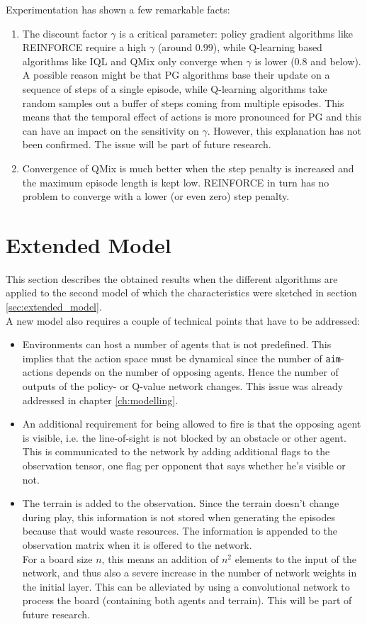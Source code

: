 Experimentation has shown a few remarkable facts:
\begin{enumerate}
    \item The discount factor $\gamma$ is a critical parameter: policy gradient algorithms like REINFORCE require a high $\gamma$ (around $0.99$), while Q-learning based algorithms like IQL and QMix only converge when $\gamma$ is lower ($0.8$ and below). A possible reason might be that PG algorithms base their update on a sequence of steps of a single episode, while Q-learning algorithms take random samples out a buffer of steps coming from multiple episodes. This means that the temporal effect of actions is more pronounced for PG and this can have an impact on the sensitivity on $\gamma$. However, this explanation has not been confirmed. The issue will be part of future research.
    \item Convergence of QMix is much better when the step penalty is increased and the maximum episode length is kept low. REINFORCE in turn has no problem to converge with a lower (or even zero) step penalty.
\end{enumerate}

\section{Extended Model}
\label{sec:init_model_applied}
This section describes the obtained results when the different algorithms are applied to the second model of which the characteristics were sketched in section \ref{sec:extended_model}.\\
A new model also requires a couple of technical points that have to be addressed:
\begin{itemize}
    \item Environments can host a number of agents that is not predefined. This implies that the action space must be dynamical since the number of {\tt aim}-actions depends on the number of opposing agents. Hence the number of outputs of the policy- or Q-value network changes. This issue was already addressed in chapter \ref{ch:modelling}.
    \item An additional requirement for being allowed to fire is that the opposing agent is visible, i.e. the line-of-sight is not blocked by an obstacle or other agent. This is communicated to the network by adding additional flags to the observation tensor, one flag per opponent that says whether he's visible or not.
    \item The terrain is added to the observation. Since the terrain doesn't change during play, this information is not stored when generating the episodes because that would waste resources. The information is appended to the observation matrix when it is offered to the network.\\
    For a board size $n$, this means an addition of $n^2$ elements to the input of the network, and thus also a severe increase in the number of network weights in the initial layer. This can be alleviated by using a convolutional network to process the board (containing both agents and terrain). This will be part of future research.
\end{itemize}

